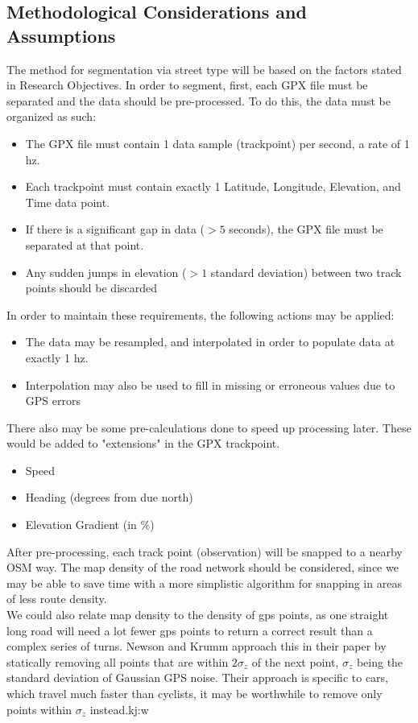 \documentclass[12pt,a4paper]{report}
\begin{document}
\subsection{Methodological Considerations and Assumptions}
The method for segmentation via street type will be based on the factors stated in Research Objectives. In order to segment, first, each GPX file
must be separated and the data should be pre-processed. To do this, the data must be organized as such:
\begin{itemize}
	\item The GPX file must contain 1 data sample (trackpoint) per second, a rate of 1 hz.
	\item Each trackpoint must contain exactly 1 Latitude, Longitude, Elevation, and Time data point.
	\item If there is a significant gap in data ($>{}5$ seconds), the GPX file must be separated at that point.
	\item Any sudden jumps in elevation ($>{}1$ standard deviation) between two track points should be discarded
\end{itemize}
In order to maintain these requirements, the following actions may be applied:
\begin{itemize}
	\item The data may be resampled, and interpolated in order to populate data at exactly 1 hz.
	\item Interpolation may also be used to fill in missing or erroneous values due to GPS errors
\end{itemize}
There also may be some pre-calculations done to speed up processing later. These would be added to "extensions" in the GPX trackpoint.
\begin{itemize}
	\item Speed
	\item Heading (degrees from due north)
	\item Elevation Gradient (in \%)
\end{itemize}
After pre-processing, each track point (observation) will be snapped to a nearby OSM way. The map density of the road network should be considered,
since we may be able to save time with a more simplistic algorithm for snapping in areas of less route density.\\
We could also relate map density to the density of gps points, as one straight long road will need a lot fewer gps points to return a correct result than a complex series of turns.
Newson and Krumm approach this in their paper by statically removing all points that are within $2\sigma_z$ of the next point, $\sigma_z$ being the standard deviation of Gaussian GPS noise.
Their approach is specific to cars, which travel much faster than cyclists, it may be worthwhile to remove only points within $\sigma_z$ instead.kj:w
\end{document}
